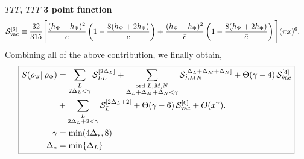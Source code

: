 \documentclass[11pt]{article}
\newcommand{\p}{\partial}
\newcommand{\nn}{\nonumber}
\newcommand{\lb}{\left(}
\newcommand{\rb}{\right)}
\begin{document}
\textbf{$TTT$, $\bar T\bar T \bar T$ 3 point function}
\begin{align}
    \mathcal S_{\rm vac}^{[6]}
    &\equiv
    \frac{32}{315}
    \Bigg[
    \frac{(h_\Psi-h_\Phi)^2}{c}
    \left(
    1-\frac{8(h_\Psi+2h_\Phi)}{c}
    \right)
    +
    \frac{(\bar h_\Psi-\bar h_\Phi)^2}{\bar c}
    \left(
    1-\frac{8(\bar h_\Psi+2\bar h_\Phi)}{\bar c}
    \right)
    \Bigg]
    (\pi x)^6 .
\end{align}
Combining all of the above contribution, we finally obtain,
\begin{align}
\boxed{
\begin{aligned}
S(\rho_\Psi\|\rho_\Phi)
&=
\sum_{\substack{L\\2\Delta_L<\gamma}}
\mathcal S_{LL}^{[2\Delta_L]}
+
\sum_{\substack{{\rm ord}\;L,M,N\\
\Delta_L+\Delta_M+\Delta_N<\gamma}}
\mathcal S_{LMN}^{[\Delta_L+\Delta_M+\Delta_N]}+
\Theta(\gamma-4)\,
\mathcal S_{\rm vac}^{[4]}
\nn\\&+
\sum_{\substack{L\\2\Delta_L+2<\gamma}}
\mathcal S_L^{[2\Delta_L+2]}+
\Theta(\gamma-6)\,
\mathcal S_{\rm vac}^{[6]}
+
O(x^\gamma).\\
\gamma &= \min (4\Delta_*,8)\\
\Delta_* &= \min \{\Delta_L\}
\end{aligned}}
\end{align}
\end{document}
